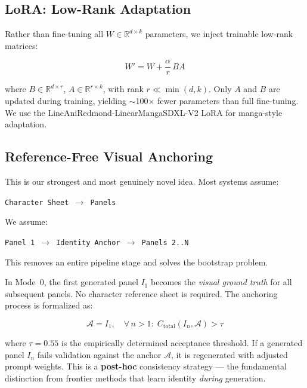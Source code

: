 \documentclass[11pt,a4paper,twocolumn]{article}
\begin{document}
\subsection{LoRA: Low-Rank Adaptation}

Rather than fine-tuning all $W \in \mathbb{R}^{d \times k}$ parameters, we inject trainable low-rank matrices:

\begin{equation}
W' = W + \frac{\alpha}{r}\, B A
\label{eq:lora}
\end{equation}

\noindent where $B \in \mathbb{R}^{d \times r}$, $A \in \mathbb{R}^{r \times k}$, with rank $r \ll \min(d, k)$. Only $A$ and $B$ are updated during training, yielding $\sim$100$\times$ fewer parameters than full fine-tuning. We use the LineAniRedmond-LinearMangaSDXL-V2 LoRA for manga-style adaptation.

\subsection{Reference-Free Visual Anchoring}
\label{sec:anchoring}

\begin{noveltybox}
This is our strongest and most genuinely novel idea. Most systems assume:

\begin{center}
\texttt{Character Sheet $\rightarrow$ Panels}
\end{center}

We assume:

\begin{center}
\texttt{Panel 1 $\rightarrow$ Identity Anchor $\rightarrow$ Panels 2..N}
\end{center}

This removes an entire pipeline stage and solves the bootstrap problem.
\end{noveltybox}

In Mode~0, the first generated panel $I_1$ becomes the \textit{visual ground truth} for all subsequent panels. No character reference sheet is required. The anchoring process is formalized as:

\begin{equation}
\mathcal{A} = I_1, \quad \forall\, n > 1:\; C_{\text{total}}(I_n, \mathcal{A}) > \tau
\label{eq:anchor}
\end{equation}

\noindent where $\tau = 0.55$ is the empirically determined acceptance threshold. If a generated panel $I_n$ fails validation against the anchor $\mathcal{A}$, it is regenerated with adjusted prompt weights. This is a \textbf{post-hoc} consistency strategy --- the fundamental distinction from frontier methods that learn identity \textit{during} generation.
\end{document}
